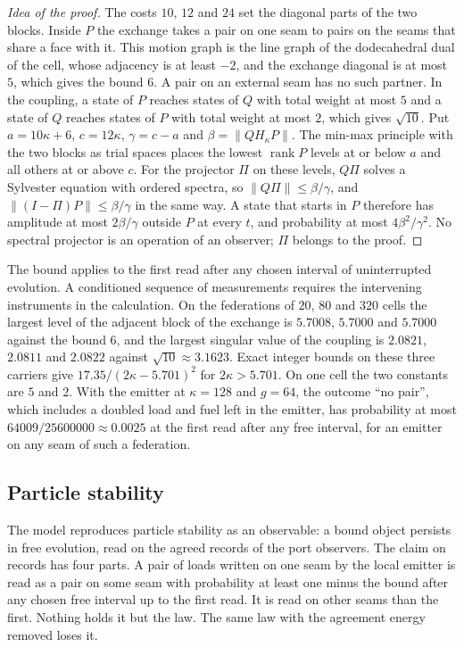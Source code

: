 \documentclass[11pt]{article}
\theoremstyle{definition}
\theoremstyle{remark}
\begin{document}
\begin{proof}[Idea of the proof]
The costs $10$, $12$ and $24$ set the diagonal parts of the two blocks.
Inside $P$ the exchange takes a pair on one seam to pairs on the seams
that share a face with it. This motion graph is the line graph of the
dodecahedral dual of the cell, whose adjacency is at least $-2$, and the
exchange diagonal is at most $5$, which gives the bound $6$. A pair on an
external seam has no such partner. In the coupling, a state of $P$ reaches
states of $Q$ with total weight at most $5$ and a state of $Q$ reaches
states of $P$ with total weight at most $2$, which gives $\sqrt{10}$. Put
$a=10\kappa+6$, $c=12\kappa$, $\gamma=c-a$ and $\beta=\|QH_\kappa P\|$. The
min-max principle with the two blocks as trial spaces places the lowest
$\operatorname{rank}P$ levels at or below $a$ and all others at or above
$c$. For the projector $\Pi$ on these levels, $Q\Pi$ solves a Sylvester
equation with ordered spectra, so $\|Q\Pi\|\le\beta/\gamma$, and
$\|(I-\Pi)P\|\le\beta/\gamma$ in the same way. A state that starts in $P$
therefore has amplitude at most $2\beta/\gamma$ outside $P$ at every $t$,
and probability at most $4\beta^2/\gamma^2$. No spectral projector is an
operation of an observer; $\Pi$ belongs to the proof.
\end{proof}

The bound applies to the first read after any chosen interval of
uninterrupted evolution. A conditioned sequence of measurements requires
the intervening instruments in the calculation. On the federations of $20$, $80$
and $320$ cells the largest level of the adjacent block of the exchange is
$5.7008$, $5.7000$ and $5.7000$ against the bound $6$, and the largest
singular value of the coupling is $2.0821$, $2.0811$ and $2.0822$ against
$\sqrt{10}\approx3.1623$. Exact integer bounds on these three
carriers give $17.35/(2\kappa-5.701)^2$ for $2\kappa>5.701$. On
one cell the two constants are $5$ and $2$. With the emitter at
$\kappa=128$ and $g=64$, the outcome ``no pair'', which includes a doubled
load and fuel left in the emitter, has probability at most
$64009/25600000\approx0.0025$ at the first read after any free interval, for an emitter on any
seam of such a federation.

\subsection{Particle stability}
\label{sec:particle-stability}

The model reproduces particle stability as an observable: a bound object
persists in free evolution, read on the agreed records of the port
observers. The claim on records has four parts. A pair of loads written on
one seam by the local emitter is read as a pair on some seam with
probability at least one minus the bound after any chosen free interval up to the first read. It is read on
other seams than the first. Nothing holds it but the law. The same law
with the agreement energy removed loses it.
\end{document}
